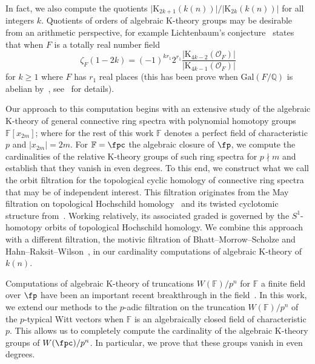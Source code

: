 \documentclass[english,10pt]{amsart}
\newcommand{\field}{\mathbb{F}}
\theoremstyle{definition}
\numberwithin{equation}{section}
\begin{document}
In fact, we also compute the quotients $\lvert \mathrm{K}_{2k+1}(k(n))\rvert/\lvert \mathrm{K}_{2k}(k(n))\rvert$ for all integers $k$. 
Quotients of orders of algebraic K-theory groups may be desirable from an arithmetic perspective, for example Lichtenbaum's conjecture~\cite[Conjecture~2.4]{Lic73} states that when $F$ is a totally real number field 
\[ \zeta_{F}(1-2k) = (-1)^{kr_1}2^{r_1}\frac{\lvert \mathrm{K}_{4k-2}(\mathcal{O}_F)\rvert }{\lvert \mathrm{K}_{4k-1}(\mathcal{O}_F)\rvert }
\]
for $k\geq 1$ where $F$ has $r_1$ real places (this has been prove when  $\mathrm{Gal}(F/\mathbb{Q})$ is abelian by~\cite{Voe11}, see~\cite[Theorem~8.8]{Wei13} for details).

Our approach to this computation begins with an extensive study of the algebraic K-theory of general connective ring spectra with polynomial homotopy groups $\field[x_{2m}]$; where for the rest of this work $\field$ denotes a perfect field of characteristic $p$ and $\lvert x_{2m} \rvert = 2m$. For $\field = \fpc$ the algebraic closure of $\fp$, we compute the cardinalities  of the relative  K-theory groups of such ring spectra for $p \nmid m$ and establish that they vanish in even degrees. To this end, we construct what we call the orbit filtration for the  topological cyclic homology of connective ring spectra that may be of independent interest. This filtration originates from the May filtration on topological Hochschild homology~\cite{AKS18} and its twisted cyclotomic structure from~\cite{antieau2020beilinson}. Working relatively, its associated graded is governed by the $S^1$-homotopy orbits of topological Hochschild homology. We combine this approach with a different filtration, the motivic filtration of Bhatt--Morrow--Scholze \cite{bhatt2019thhandintegralpadichodge} and Hahn--Raksit--Wilson~\cite{hahn2022motivic}, in our cardinality computations of algebraic K-theory of $k(n)$. 

Computations of algebraic K-theory of truncations $W(\field)/p^n$ for $\field$ a finite field over $\fp$ have been an important recent breakthrough in the field~\cite{KS24,AKN24}. In this work, we extend our methods to the $p$-adic filtration on the truncation $W(\field)/p^n$ of the $p$-typical Witt vectors when $\field$ is an algebraically closed field of characteristic $p$. This allows us to completely compute the cardinality of the algebraic K-theory groups of $W(\fpc)/p^n$. In particular, we prove that these groups vanish in even degrees. 
\end{document}
